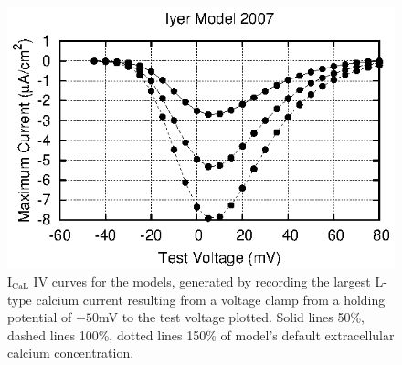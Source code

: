 \documentclass[preprint,authoryear,12pt]{elsarticle}
\begin{document}
\begin{figure}
\begin{center}
\includegraphics[width=0.32\linewidth]{iyer_model_2007_ICaL_IV_curve}
\caption{I$_\textrm{CaL}$ IV curves for the models, generated by recording the largest L-type calcium current resulting from a voltage clamp from a holding potential of $-50$mV to the test voltage plotted. Solid lines 50\%, dashed lines 100\%, dotted lines 150\% of model's default extracellular calcium concentration.}
\label{fig:ICaL_IV_curves:rest1}
\end{center}
\end{figure}
\end{document}
